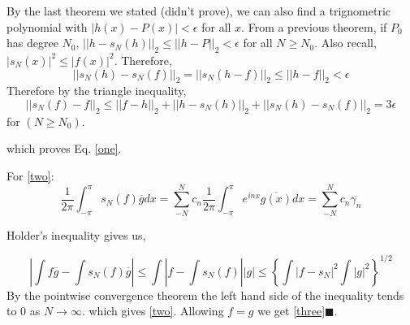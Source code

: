 \documentclass{article}
\begin{document}
By the last  theorem we stated (didn't prove), we can also find a trignometric polynomial with $|h(x)-P(x)|<\epsilon$ for all $x$. From a previous theorem, if $P_0$ has degree $N_0$,
$||h-s_N(h)||_2 \leq ||h-P||_2<\epsilon$ for all $N\geq N_0$.   Also recall, $|s_N(x)|^2\leq|f(x)|^2$.  Therefore,
\begin{equation}
||s_N(h)-s_N(f)||_2=||s_N(h-f)||_2 \leq ||h-f||_2 <\epsilon
\end{equation}
Therefore by the triangle inequality,
\begin{equation}
||s_N(f)-f||_2\leq||f-h||_2+||h-s_N(h)||_2+||s_N(h)-s_N(f)||_2=3\epsilon
\end{equation}
for $(N\geq N_0)$.

which proves Eq.  \ref{one}.

For \ref{two}:
\begin{equation}
\frac{1}{2\pi}\int_{-\pi}^{\pi}s_N(f)\overline{g}dx = \sum_{-N}^Nc_n\frac{1}{2\pi}\int_{-\pi}^\pi e^{inx}\overline{g(x)}dx = \sum_{-N}^{N} c_n \overline{\gamma_n}
\end{equation}

Holder's inequality gives us,

\begin{equation}
\left|\int f\overline{g} -\int s_N(f)\overline{g}\right| \leq \int \left|f-\int s_N(f)\right|\left|g\right| \leq\left\{\int|f-s_N|^2\int|g|^2\right\}^{1\slash2}
\end{equation}
By the pointwise convergence theorem the left hand side of the inequality tends to 0 as $N\rightarrow \infty$. which gives \ref{two}.  Allowing $f=g$ we get \ref{three}$\blacksquare$.
\end{document}
